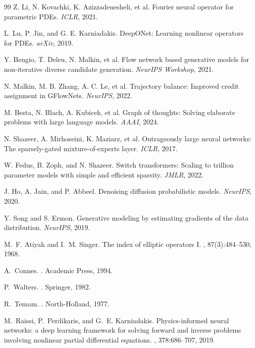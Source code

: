 \documentclass[11pt]{article}
\theoremstyle{definition}
\theoremstyle{plain}
\theoremstyle{remark}
\begin{document}
\begin{thebibliography}{99}
Z. Li, N. Kovachki, K. Azizzadenesheli, et al.
\newblock Fourier neural operator for parametric PDEs.
\newblock \emph{ICLR}, 2021.

L. Lu, P. Jin, and G. E. Karniadakis.
\newblock DeepONet: Learning nonlinear operators for PDEs.
\newblock \emph{arXiv}, 2019.

Y. Bengio, T. Deleu, N. Malkin, et al.
\newblock Flow network based generative models for non-iterative diverse candidate generation.
\newblock \emph{NeurIPS Workshop}, 2021.

N. Malkin, M. B. Zhang, A. C. Le, et al.
\newblock Trajectory balance: Improved credit assignment in GFlowNets.
\newblock \emph{NeurIPS}, 2022.

M. Besta, N. Blach, A. Kubicek, et al.
\newblock Graph of thoughts: Solving elaborate problems with large language models.
\newblock \emph{AAAI}, 2024.

N. Shazeer, A. Mirhoseini, K. Maziarz, et al.
\newblock Outrageously large neural networks: The sparsely-gated mixture-of-experts layer.
\newblock \emph{ICLR}, 2017.

W. Fedus, B. Zoph, and N. Shazeer.
\newblock Switch transformers: Scaling to trillion parameter models with simple and efficient sparsity.
\newblock \emph{JMLR}, 2022.

J. Ho, A. Jain, and P. Abbeel.
\newblock Denoising diffusion probabilistic models.
\newblock \emph{NeurIPS}, 2020.

Y. Song and S. Ermon.
\newblock Generative modeling by estimating gradients of the data distribution.
\newblock \emph{NeurIPS}, 2019.

M.~F. Atiyah and I.~M. Singer.
\newblock The index of elliptic operators {I}.
, 87(3):484--530, 1968.

A.~Connes.
.
\newblock Academic Press, 1994.

P.~Walters.
.
\newblock Springer, 1982.

R.~Temam.
.
\newblock North-Holland, 1977.

M.~Raissi, P.~Perdikaris, and G.~E. Karniadakis.
\newblock Physics-informed neural networks: a deep learning framework for solving forward and inverse problems involving nonlinear partial differential equations.
, 378:686--707, 2019.

\end{thebibliography}
\end{document}
